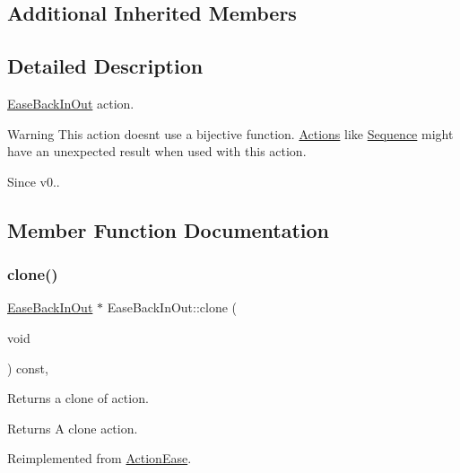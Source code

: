 \subsection*{Additional Inherited Members}


\subsection{Detailed Description}
\hyperlink{classEaseBackInOut}{Ease\+Back\+In\+Out} action. 

\begin{DoxyWarning}{Warning}
This action doesn\textquotesingle{}t use a bijective function. \hyperlink{classActions}{Actions} like \hyperlink{classSequence}{Sequence} might have an unexpected result when used with this action. 
\end{DoxyWarning}
\begin{DoxySince}{Since}
v0.. 
\end{DoxySince}


\subsection{Member Function Documentation}
\mbox{\label{classEaseBackInOut_a30f30de6135349f2454843428d7777e3}} 
\subsubsection{\texorpdfstring{clone()}{clone()}}
{\footnotesize\ttfamily \hyperlink{classEaseBackInOut}{Ease\+Back\+In\+Out} $\ast$ Ease\+Back\+In\+Out\+::clone (\begin{DoxyParamCaption}\item[{void}]{ }\end{DoxyParamCaption}) const\hspace{0.3cm}{\ttfamily [override]}, {\ttfamily [virtual]}}

Returns a clone of action.

\begin{DoxyReturn}{Returns}
A clone action. 
\end{DoxyReturn}


Reimplemented from \hyperlink{classActionEase_a39bec93fe161fb732a74d8e51a2fe08b}{Action\+Ease}.

\mbox{\label{classEaseBackInOut_a755d76abb67049a064cf4a5e7ffda9f0}} 
